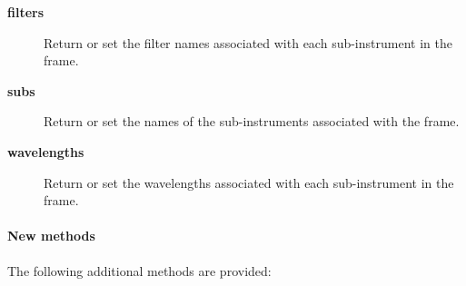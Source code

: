 \begin{description}

\item[\textbf{filters}] \mbox{}

Return or set the filter names associated with each sub-instrument
in the frame.


\item[\textbf{subs}] \mbox{}

Return or set the names of the sub-instruments associated
with the frame.


\item[\textbf{wavelengths}] \mbox{}

Return or set the wavelengths associated with each  sub-instrument
in the frame.

\end{description}
\paragraph*{New methods\label{ORAC::Frame::JCMT_New_methods}}


The following additional methods are provided:

